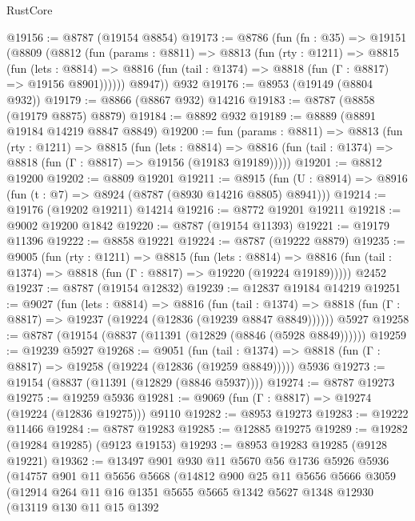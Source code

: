 \begin{lexlean}{RustCore}
\begin{coremodule}
@19156 := @8787 (@19154 @8854)
@19173 := @8786
    (fun (fn : @35) =>
    @19151
      (@8809
        (@8812
          (fun (params : @8811) =>
          @8813
            (fun (rty : @1211) =>
            @8815
              (fun (lets : @8814) =>
              @8816 (fun (tail : @1374) => @8818 (fun (Γ : @8817) => @19156 @8901))))))
        @8947))
    @932
@19176 := @8953 (@19149 (@8804 @932))
@19179 := @8866 (@8867 @932) @14216
@19183 := @8787 (@8858 (@19179 @8875) @8879)
@19184 := @8892 @932
@19189 := @8889 (@8891 @19184 @14219 @8847 @8849)
@19200 := fun (params : @8811) =>
  @8813
    (fun (rty : @1211) =>
    @8815
      (fun (lets : @8814) =>
      @8816 (fun (tail : @1374) => @8818 (fun (Γ : @8817) => @19156 (@19183 @19189)))))
@19201 := @8812 @19200
@19202 := @8809 @19201
@19211 := @8915
    (fun (U : @8914) => @8916 (fun (t : @7) => @8924 (@8787 (@8930 @14216 @8805) @8941)))
@19214 := @19176 (@19202 @19211) @14214
@19216 := @8772 @19201 @19211
@19218 := @9002 @19200 @1842
@19220 := @8787 (@19154 @11393)
@19221 := @19179 @11396
@19222 := @8858 @19221
@19224 := @8787 (@19222 @8879)
@19235 := @9005
    (fun (rty : @1211) =>
    @8815
      (fun (lets : @8814) =>
      @8816 (fun (tail : @1374) => @8818 (fun (Γ : @8817) => @19220 (@19224 @19189)))))
    @2452
@19237 := @8787 (@19154 @12832)
@19239 := @12837 @19184 @14219
@19251 := @9027
    (fun (lets : @8814) =>
    @8816
      (fun (tail : @1374) =>
      @8818 (fun (Γ : @8817) => @19237 (@19224 (@12836 (@19239 @8847 @8849))))))
    @5927
@19258 := @8787 (@19154 (@8837 (@11391 (@12829 (@8846 (@5928 @8849))))))
@19259 := @19239 @5927
@19268 := @9051
    (fun (tail : @1374) => @8818 (fun (Γ : @8817) => @19258 (@19224 (@12836 (@19259 @8849)))))
    @5936
@19273 := @19154 (@8837 (@11391 (@12829 (@8846 @5937))))
@19274 := @8787 @19273
@19275 := @19259 @5936
@19281 := @9069 (fun (Γ : @8817) => @19274 (@19224 (@12836 @19275))) @9110
@19282 := @8953 @19273
@19283 := @19222 @11466
@19284 := @8787 @19283
@19285 := @12885 @19275
@19289 := @19282 (@19284 @19285) (@9123 @19153)
@19293 := @8953 @19283 @19285 (@9128 @19221)
@19362 := @13497
    @901
    @930
    @11
    @5670
    @56
    @1736
    @5926
    @5936
    (@14757
      @901
      @11
      @5656
      @5668
      (@14812
        @900
        @25
        @11
        @5656
        @5666
        @3059
        (@12914
          @264
          @11
          @16
          @1351
          @5655
          @5665
          @1342
          @5627
          @1348
          @12930
          (@13119
            @130
            @11
            @15
            @1392

\end{coremodule}
\end{lexlean}
